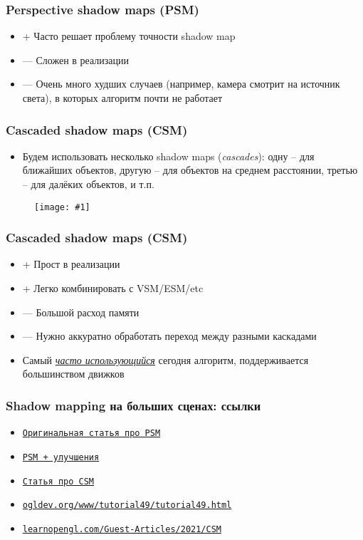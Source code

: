 \documentclass[10pt]{beamer}
\newcommand{\slideimage}[1]{
  \begin{figure}
    \begin{adjustbox}{width=\textwidth, totalheight=\textheight-2\baselineskip-2\baselineskip,keepaspectratio}
      \texttt{[image: \#1]}
    \end{adjustbox}
  \end{figure}
}
\begin{document}
\begin{frame}[fragile]
\frametitle{Perspective shadow maps (PSM)}
\begin{itemize}
\item {\color{green}+} Часто решает проблему точности shadow map
\item {\color{red}—} Сложен в реализации
\item {\color{red}—} Очень много худших случаев (например, камера смотрит на источник света), в которых алгоритм почти не работает
\end{itemize}
\end{frame}

\begin{frame}[fragile]
\frametitle{Cascaded shadow maps (CSM)}
\begin{itemize}
\item Будем использовать несколько shadow maps (\textit{cascades}): одну -- для ближайших объектов, другую -- для объектов на среднем расстоянии, третью -- для далёких объектов, и т.п.
\end{itemize}
\slideimage{csm.jpg}
\end{frame}

\begin{frame}[fragile]
\frametitle{Cascaded shadow maps (CSM)}
\begin{itemize}
\item {\color{green}+} Прост в реализации
\item {\color{green}+} Легко комбинировать с VSM/ESM/etc
\item {\color{red}—} Большой расход памяти
\item {\color{red}—} Нужно аккуратно обработать переход между разными каскадами
\item Самый \textit{\underline{часто использующийся}} сегодня алгоритм, поддерживается большинством движков
\end{itemize}
\end{frame}

\begin{frame}[fragile]
\frametitle{Shadow mapping на больших сценах: ссылки}
\begin{itemize}
\item \href{https://www-sop.inria.fr/reves/Basilic/2002/SD02/PerspectiveShadowMaps.pdf}{\texttt{Оригинальная статья про PSM}}
\item \href{https://developer.download.nvidia.com/books/HTML/gpugems/gpugems_ch14.html}{\texttt{PSM + улучшения}}
\item \href{https://developer.download.nvidia.com/SDK/10.5/opengl/src/cascaded_shadow_maps/doc/cascaded_shadow_maps.pdf}{\texttt{Статья про CSM}}
\item \href{https://ogldev.org/www/tutorial49/tutorial49.html}{\texttt{ogldev.org/www/tutorial49/tutorial49.html}}
\item \href{https://learnopengl.com/Guest-Articles/2021/CSM}{\texttt{learnopengl.com/Guest-Articles/2021/CSM}}
\end{itemize}
\end{frame}
\end{document}
